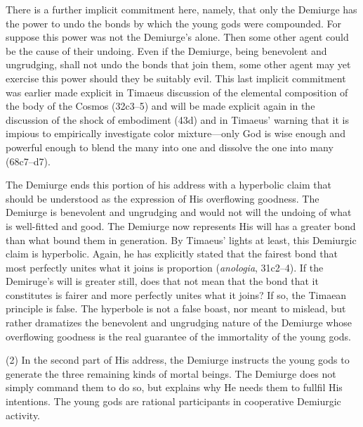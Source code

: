 There is a further implicit commitment here, namely, that only the Demiurge has the power to undo the bonds by which the young gods were compounded. For suppose this power was not the Demiurge's alone. Then some other agent could be the cause of their undoing. Even if the Demiurge, being benevolent and ungrudging, shall not undo the bonds that join them, some other agent may yet exercise this power should they be suitably evil. This last implicit commitment was earlier made explicit in Timaeus discussion of the elemental composition of the body of the Cosmos (32c3--5) and will be made explicit again in the discussion of the shock of embodiment (43d) and in Timaeus' warning that it is impious to empirically investigate color mixture---only God is wise enough and powerful enough to blend the many into one and dissolve the one into many (68c7–d7).

The Demiurge ends this portion of his address with a hyperbolic claim that should be understood as the expression of His overflowing goodness. The Demiurge is benevolent and ungrudging and would not will the undoing of what is well-fitted and good. The Demiurge now represents His will has a greater bond than what bound them in generation. By Timaeus' lights at least, this Demiurgic claim is hyperbolic. Again, he has explicitly stated that the fairest bond that most perfectly unites what it joins is proportion (\emph{anologia}, 31c2--4). If the Demiruge's will is greater still, does that not mean that the bond that it constitutes is fairer and more perfectly unites what it joins? If so, the Timaean principle is false. The hyperbole is not a false boast, nor meant to mislead, but rather dramatizes the benevolent and ungrudging nature of the Demiurge whose overflowing goodness is the real guarantee of the immortality of the young gods. 

(2) In the second part of His address, the Demiurge instructs the young gods to generate the three remaining kinds of mortal beings. The Demiurge does not simply command them to do so, but explains why He needs them to fullfil His intentions. The young gods are rational participants in cooperative Demiurgic activity.

